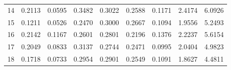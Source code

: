 \begin{anexosenv}
\begin{table}[htbp!]
\begin{tabular}{|l|l|l|l|l|l|l|l|l|}
14   & 0.2113  & 0.0595   & 0.3482               & 0.3022  & 0.2588   & 0.1171               & 2.4174  & 6.0926               \\
15   & 0.1211  & 0.0526   & 0.2470               & 0.3000  & 0.2667   & 0.1094               & 1.9556  & 5.2493               \\
16   & 0.2142  & 0.1167   & 0.2601               & 0.2801  & 0.2196   & 0.1376               & 2.2237  & 5.6154               \\
17   & 0.2049  & 0.0833   & 0.3137               & 0.2744  & 0.2471   & 0.0995               & 2.0404  & 4.9823               \\
18   & 0.1718  & 0.0733   & 0.2954               & 0.2901  & 0.2549   & 0.1091               & 1.8627  & 4.4811              \\\hline
\end{tabular}
\end{table}



\end{anexosenv}
